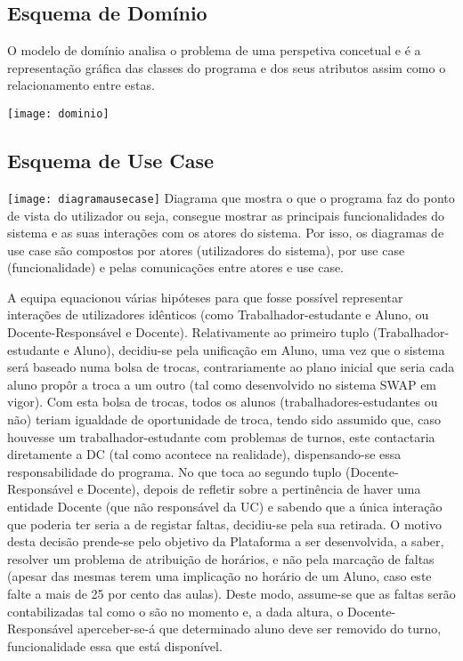 \documentclass[a4paper]{article}
\begin{document}
\subsection{Esquema de Domínio}
O modelo de domínio analisa o problema de uma perspetiva concetual e é a representação gráfica das classes do programa e dos seus atributos assim como o relacionamento entre estas.

\texttt{[image: dominio]}\break

\subsection{Esquema de Use Case}

\texttt{[image: diagramausecase]}\break
Diagrama que mostra o que o programa faz do ponto de vista do utilizador ou seja, consegue mostrar as principais funcionalidades do sistema e as suas interações com os atores do sistema. Por isso, os diagramas de use case são compostos por atores (utilizadores do sistema), por use case (funcionalidade) e pelas comunicações entre atores e use case.

A equipa equacionou várias hipóteses para que fosse possível representar interações de utilizadores idênticos (como Trabalhador-estudante e Aluno, ou Docente-Responsável e Docente). Relativamente ao primeiro tuplo (Trabalhador-estudante e Aluno), decidiu-se pela unificação em Aluno, uma vez que o sistema será baseado numa bolsa de trocas, contrariamente ao plano inicial que seria cada aluno propôr a troca a um outro (tal como desenvolvido no sistema SWAP em vigor). Com esta bolsa de trocas, todos os alunos (trabalhadores-estudantes ou não) teriam igualdade de oportunidade de troca, tendo sido assumido que, caso houvesse um trabalhador-estudante com problemas de turnos, este contactaria diretamente a DC (tal como acontece na realidade), dispensando-se essa responsabilidade do programa. No que toca ao segundo tuplo (Docente-Responsável e Docente), depois de refletir sobre a pertinência de haver uma entidade Docente (que não responsável da UC) e sabendo que a única interação que poderia ter seria a de registar faltas, decidiu-se pela sua retirada. O motivo desta decisão prende-se pelo objetivo da Plataforma a ser desenvolvida, a saber, resolver um problema de atribuição de horários, e não pela marcação de faltas (apesar das mesmas terem uma implicação no horário de um Aluno, caso este falte a mais de 25 por cento das aulas). Deste modo, assume-se que as faltas serão contabilizadas tal como o são no momento e, a dada altura, o Docente-Responsável aperceber-se-á que determinado aluno deve ser removido do turno, funcionalidade essa que está disponível.
\end{document}
